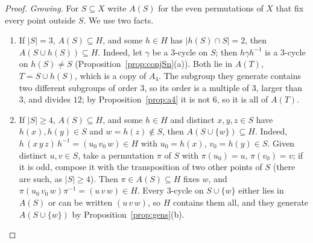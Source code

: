 \begin{proof}
\emph{Growing.} For $S\subseteq X$ write $A(S)$ for the even permutations of $X$ that fix every point outside $S$. We use two facts.
\begin{enumerate}[label=(\roman*)]
\item If $|S|=3$, $A(S)\subseteq H$, and some $h\in H$ has $|h(S)\cap S|=2$, then $A(S\cup h(S))\subseteq H$. Indeed, let $\gamma$ be a $3$-cycle on $S$; then $h\gamma h^{-1}$ is a $3$-cycle on $h(S)\ne S$ (Proposition~\ref{prop:conjSn}(a)). Both lie in $A(T)$, $T=S\cup h(S)$, which is a copy of $A_4$. The subgroup they generate contains two different subgroups of order $3$, so its order is a multiple of $3$, larger than $3$, and divides $12$; by Proposition~\ref{prop:a4} it is not $6$, so it is all of $A(T)$.
\item If $|S|\ge4$, $A(S)\subseteq H$, and some $h\in H$ and distinct $x,y,z\in S$ have $h(x),h(y)\in S$ and $w=h(z)\notin S$, then $A(S\cup\{w\})\subseteq H$. Indeed, $h\,(x\,y\,z)\,h^{-1}=(u_0\,v_0\,w)\in H$ with $u_0=h(x)$, $v_0=h(y)\in S$. Given distinct $u,v\in S$, take a permutation $\pi$ of $S$ with $\pi(u_0)=u$, $\pi(v_0)=v$; if it is odd, compose it with the transposition of two other points of $S$ (there are such, as $|S|\ge4$). Then $\pi\in A(S)\subseteq H$ fixes $w$, and $\pi(u_0\,v_0\,w)\pi^{-1}=(u\,v\,w)\in H$. Every $3$-cycle on $S\cup\{w\}$ either lies in $A(S)$ or can be written $(u\,v\,w)$, so $H$ contains them all, and they generate $A(S\cup\{w\})$ by Proposition~\ref{prop:gens}(b).
\end{enumerate}


\end{proof}
